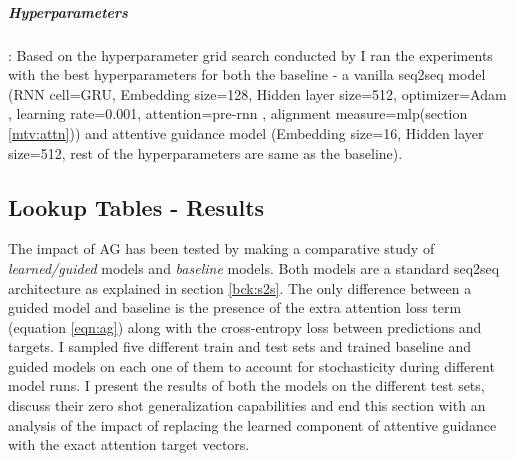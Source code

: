 \subparagraph{Hyperparameters}: Based on the hyperparameter grid search conducted by \cite{Hupkes2018} I ran the experiments with the best hyperparameters for both the baseline - a vanilla seq2seq model (RNN cell=GRU, Embedding size=128, Hidden layer size=512, optimizer=Adam \citep{KingmaB14}, learning rate=0.001, attention=pre-rnn \citep{Bahdanau2014}, alignment measure=mlp(section \ref{mtv:attn})) and attentive guidance model (Embedding size=16, Hidden layer size=512, rest of the hyperparameters are same as the baseline).

\subsection{Lookup Tables - Results}
The impact of AG has been tested by making a comparative study of \textit{learned/guided} models and \textit{baseline} models. Both models are a standard seq2seq architecture as explained in section \ref{bck:s2s}. The only difference between a guided model and baseline is the presence of the extra attention loss term (equation \ref{eqn:ag}) along with the cross-entropy loss between predictions and targets. I sampled five different train and test sets and trained baseline and guided models on each one of them to account for stochasticity during different model runs. I present the results of both the models on the different test sets, discuss their zero shot generalization capabilities and end this section with an analysis of the impact of replacing the learned component of attentive guidance with the exact attention target vectors.

